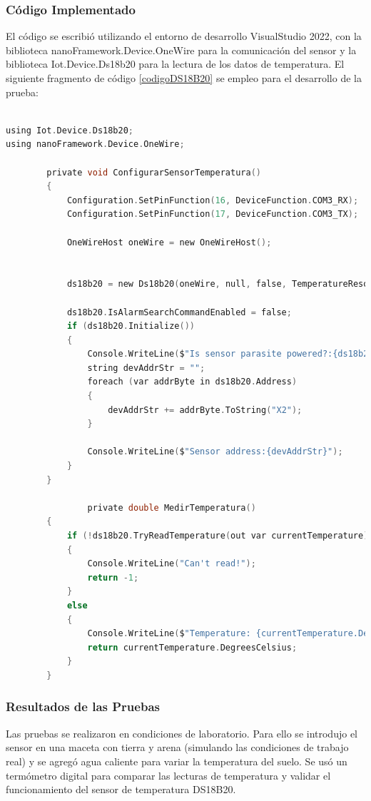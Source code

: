 \subsubsection{Código Implementado}
El código se escribió utilizando el entorno de desarrollo VisualStudio 2022, con la biblioteca nanoFramework.Device.OneWire para la comunicación del sensor y la biblioteca Iot.Device.Ds18b20 para la lectura de los datos de temperatura. El siguiente fragmento de código \ref{codigoDS18B20} se empleo para el desarrollo de la prueba:
\begin{lstlisting}[language=C, label=codigoDS18B20, caption= Fragmento del código del sensor de temperatura DS18B20]

using Iot.Device.Ds18b20;
using nanoFramework.Device.OneWire;

        private void ConfigurarSensorTemperatura()
        {
            Configuration.SetPinFunction(16, DeviceFunction.COM3_RX);
            Configuration.SetPinFunction(17, DeviceFunction.COM3_TX);

            OneWireHost oneWire = new OneWireHost();


            ds18b20 = new Ds18b20(oneWire, null, false, TemperatureResolution.VeryHigh);

            ds18b20.IsAlarmSearchCommandEnabled = false;
            if (ds18b20.Initialize())
            {
                Console.WriteLine($"Is sensor parasite powered?:{ds18b20.IsParasitePowered}");
                string devAddrStr = "";
                foreach (var addrByte in ds18b20.Address)
                {
                    devAddrStr += addrByte.ToString("X2");
                }

                Console.WriteLine($"Sensor address:{devAddrStr}");
            }
        }

                private double MedirTemperatura()
        {
            if (!ds18b20.TryReadTemperature(out var currentTemperature))
            {
                Console.WriteLine("Can't read!");
                return -1;
            }
            else
            {
                Console.WriteLine($"Temperature: {currentTemperature.DegreesCelsius.ToString("F")}\u00B0C");
                return currentTemperature.DegreesCelsius;
            }
        }
\end{lstlisting}

\subsubsection{Resultados de las Pruebas}
Las pruebas se realizaron en condiciones de laboratorio. Para ello se introdujo el sensor en una maceta con tierra y arena (simulando las condiciones de trabajo real) y se agregó agua caliente para variar la temperatura del suelo. Se usó un termómetro digital para comparar las lecturas de temperatura \citep{Magesa} y validar el funcionamiento del sensor de temperatura DS18B20.

